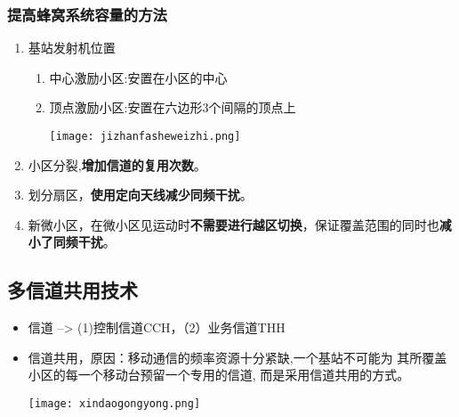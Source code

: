 	\subsubsection{提高蜂窝系统容量的方法
	}
	\begin{enumerate}
		\item 	基站发射机位置
		\begin{enumerate}
			\item  中心激励小区:安置在小区的中心
			\item  顶点激励小区:安置在六边形3个间隔的顶点上 \\
			\begin{center}
			\texttt{[image: jizhanfasheweizhi.png]}
			\end{center}
		\end{enumerate}
		\item 小区分裂,\textbf{增加信道的复用次数}。
		\item 划分扇区，\textbf{使用定向天线减少同频干扰}。
		\item 新微小区，在微小区见运动时\textbf{不需要进行越区切换}，保证覆盖范围的同时也\textbf{减小了同频干扰}。
	\end{enumerate}
	\subsection{多信道共用技术}
	\begin{itemize}
		\item 信道 --> (1)控制信道CCH，（2）业务信道THH
		\item 信道共用，原因：移动通信的频率资源十分紧缺,一个基站不可能为
		其所覆盖小区的每一个移动台预留一个专用的信道,
		而是采用信道共用的方式。
		\begin{center}
			\texttt{[image: xindaogongyong.png]}
		\end{center}
	\end{itemize}
